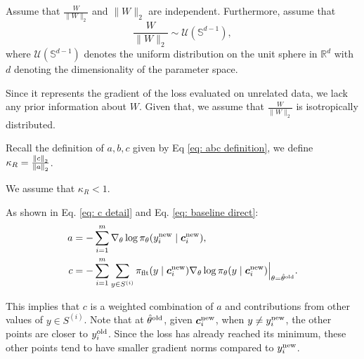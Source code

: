 \begin{assumption}
\label{asm: un-dist}
Assume that $ \frac{W}{\|W\|_2} $ and $ \|W\|_2 $ are independent. Furthermore, assume that
\begin{equation*}
\frac{W}{\|W\|_2}  \sim \mathcal{U}(\mathbb{S}^{d-1}),
\end{equation*}
where $ \mathcal{U}(\mathbb{S}^{d-1}) $ denotes the uniform distribution on the unit sphere in $ \mathbb{R}^d $ with $d$ denoting the dimensionality of the parameter space.
\end{assumption}

\begin{remark}
Since it represents the gradient of the loss evaluated on unrelated data, we lack any prior information about $ W $. Given that, we assume that $ \frac{W}{\|W\|_2} $ is isotropically distributed.
\end{remark}

Recall the definition of $a, b, c$ given by Eq \eqref{eq: abc definition},
we define $\kappa_R = \frac{\norm{c}_2}{\norm{a}_2}$. 

\begin{assumption}
\label{asm: norm ratio of a and c}
We assume that $\kappa_R < 1$.
\end{assumption}
\begin{remark}
    As shown in Eq. \eqref{eq: c detail} and Eq. \eqref{eq: baseline direct}:
    \begin{align*}
        a &= - \sum_{i=1}^m \nabla_\theta \log \pi_\theta (y_i^{\text{new}} \mid {\boldsymbol{c}}_i^{\text{new}}),\\
        c &= - \sum_{i=1}^m \sum_{y \in S^{(i)}} \pi_\text{flt}(y \mid {\boldsymbol{c}}_i^{\text{new}}) \nabla_\theta \log \pi_\theta(y \mid {\boldsymbol{c}}_i^{\text{new}}) \Big|_{\theta = \hat{\theta}^{\text{old}}}.
    \end{align*}
    
    This implies that $c$ is a weighted combination of $a$ and contributions from other values of $y \in S^{(i)}$. Note that at $\hat{\theta}^{\text{old}}$, given ${\boldsymbol{c}}_i^{\text{new}}$, when $y \neq y_i^{\text{new}}$, the other points are closer to $y_i^{\text{old}}$. Since the loss has already reached its minimum, these other points tend to have smaller gradient norms compared to $y_i^{\text{new}}$. 
\end{remark}


